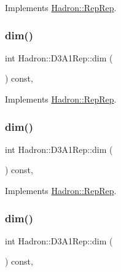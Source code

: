 Implements \mbox{\hyperlink{structHadron_1_1RepRep_a92c8802e5ed7afd7da43ccfd5b7cd92b}{Hadron\+::\+Rep\+Rep}}.

\mbox{\label{structHadron_1_1D3A1Rep_abb120c31183935cf98330a4085ff6b1c}} 
\subsubsection{\texorpdfstring{dim()}{dim()}\hspace{0.1cm}{\footnotesize\ttfamily [3/5]}}
{\footnotesize\ttfamily int Hadron\+::\+D3\+A1\+Rep\+::dim (\begin{DoxyParamCaption}{ }\end{DoxyParamCaption}) const\hspace{0.3cm}{\ttfamily [inline]}, {\ttfamily [virtual]}}



Implements \mbox{\hyperlink{structHadron_1_1RepRep_a92c8802e5ed7afd7da43ccfd5b7cd92b}{Hadron\+::\+Rep\+Rep}}.

\mbox{\label{structHadron_1_1D3A1Rep_abb120c31183935cf98330a4085ff6b1c}} 
\subsubsection{\texorpdfstring{dim()}{dim()}\hspace{0.1cm}{\footnotesize\ttfamily [4/5]}}
{\footnotesize\ttfamily int Hadron\+::\+D3\+A1\+Rep\+::dim (\begin{DoxyParamCaption}{ }\end{DoxyParamCaption}) const\hspace{0.3cm}{\ttfamily [inline]}, {\ttfamily [virtual]}}



Implements \mbox{\hyperlink{structHadron_1_1RepRep_a92c8802e5ed7afd7da43ccfd5b7cd92b}{Hadron\+::\+Rep\+Rep}}.

\mbox{\label{structHadron_1_1D3A1Rep_abb120c31183935cf98330a4085ff6b1c}} 
\subsubsection{\texorpdfstring{dim()}{dim()}\hspace{0.1cm}{\footnotesize\ttfamily [5/5]}}
{\footnotesize\ttfamily int Hadron\+::\+D3\+A1\+Rep\+::dim (\begin{DoxyParamCaption}{ }\end{DoxyParamCaption}) const\hspace{0.3cm}{\ttfamily [inline]}, {\ttfamily [virtual]}}



